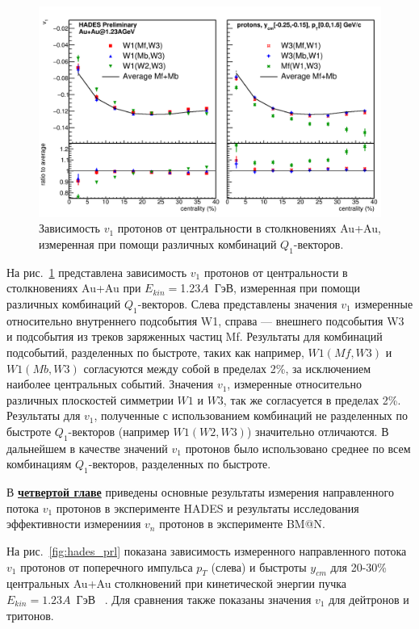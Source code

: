\begin{figure}[h]
\begin{center}
\includegraphics[width=0.65\linewidth]{images/W1AndW3Nucleus.png}
\caption{Зависимость $v_1$ протонов от центральности  в столкновениях Au+Au,
  измеренная при помощи различных комбинаций $Q_1$-векторов. }
\label{fig:hades_w1w3}
\end{center}
\end{figure}
На рис.~\ref{fig:hades_w1w3} представлена зависимость  $v_1$ протонов от центральности  в столкновениях Au+Au при $E_{kin}=$1.23$A$~ГэВ, измеренная при помощи различных комбинаций $Q_1$-векторов.
Слева представлены значения $v_1$ измеренные относительно внутреннего подсобытия W1, справа --- внешнего подсобытия W3 и подсобытия из треков заряженных частиц Mf. 
Результаты для комбинаций подсобытий, разделенных по быстроте, таких как например, $W1(Mf,W3)$ и $W1(Mb,W3)$ согласуются между собой в пределах 2\%, за исключением наиболее центральных событий. 
Значения $v_1$, измеренные относительно различных плоскостей симметрии $W1$ и $W3$, так же согласуется в пределах 2\%.
Результаты для $v_1$, полученные с использованием комбинаций не разделенных по быстроте $Q_1$-векторов (например $W1(W2,W3)$) значительно отличаются.
В дальнейшем в качестве значений $v_1$ протонов было использовано среднее по всем комбинациям $Q_1$-векторов, разделенных по быстроте.

В  \underline{\textbf{четвертой главе}} приведены основные результаты измерения направленного потока $v_1$ протонов в  эксперименте HADES и результаты исследования эффективности измерениия $v_n$ протонов в
эксперименте BM@N.

На рис.~\ref{fig:hades_prl} показана зависимость измеренного направленного потока  $v_1$ протонов от поперечного импульса $p_T$ (слева) и быстроты $y_{cm}$ для 20-30\% центральных Au+Au столкновений при кинетической энергии пучка $E_{kin}=1.23A$~ГэВ ~\cite{HADES:2020lob}. 
Для сравнения также показаны значения $v_1$   для дейтронов и тритонов.

